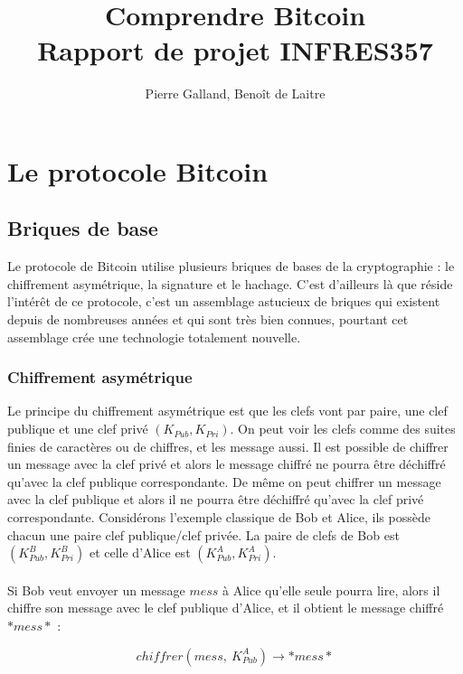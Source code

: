 \documentclass[11pt,a4paper]{article}
\title{Comprendre Bitcoin\\
Rapport de projet INFRES357
}
\author{Pierre Galland, Benoît de Laitre}
\begin{document}
\maketitle

\tableofcontents
 \nocite{*}
 
\newpage

\section{Le protocole Bitcoin}

\subsection{Briques de base}

Le protocole de Bitcoin utilise plusieurs briques de bases de la cryptographie : le chiffrement asymétrique, la signature et le hachage. C'est d'ailleurs là que réside l'intérêt de ce protocole, c'est un assemblage astucieux de briques qui existent depuis de nombreuses années et qui sont très bien connues, pourtant cet assemblage crée une technologie totalement nouvelle.

\subsubsection{Chiffrement asymétrique}

Le principe du chiffrement asymétrique est que les clefs vont par paire, une clef publique et une clef privé $(K_{Pub}, K_{Pri})$. On peut voir les clefs comme des suites finies de caractères ou de chiffres, et les message aussi. Il est possible de chiffrer un message avec la clef privé et alors le message chiffré ne pourra être déchiffré qu'avec la clef publique correspondante. De même on peut chiffrer un message avec la clef publique et alors il ne pourra être déchiffré qu'avec la clef privé correspondante. Considérons l'exemple classique de Bob et Alice, ils possède chacun une paire clef publique/clef privée. La paire de clefs de Bob est 
$(K_{Pub}^{B}, K_{Pri}^{B})$ et celle d'Alice est $(K_{Pub}^{A}, K_{Pri}^{A})$.\\\\

Si Bob veut envoyer un message $mess$ à Alice qu'elle seule pourra lire, alors il chiffre son message avec le clef publique d'Alice, et il obtient le message chiffré $*mess*$ :

$$chiffrer(mess, ~K_{Pub}^{A}) \rightarrow *mess*$$
\end{document}
